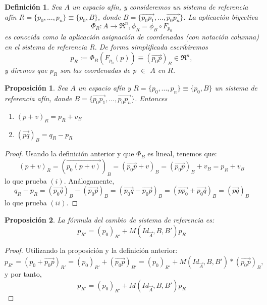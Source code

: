 \documentclass[a4paper,11pt, oneside]{book}
\newtheorem{defi}{Definición}
\newtheorem{prop}{Proposición}
\begin{document}
\begin{defi}
	Sea $A$ un espacio afín, y consideremos un sistema de referencia afín $R = \{p_0,...,p_n\} \equiv \{p_0, B\}$, donde
	$B = \{\overrightarrow{p_0p_1},...,\overrightarrow{p_0p_n}\}$. La aplicación biyectiva
	\begin{equation}
	\Phi_R : A \rightarrow \Re^n, \phi_R = \phi_B \circ F_{p_0}
	\end{equation}
	es conocida como la aplicación asignación de coordenadas (con notación columna) en el sistema de referencia R. De forma simplificada escribiremos
	\begin{equation}
	p_R := \Phi_B(F_{p_0}(p)) \equiv (\overrightarrow{p_0p})_B \in \Re^n, 
	\end{equation}
	y diremos que $p_R$ son las coordenadas de p $\in$ $A$ en $R$.
\end{defi}
\begin{prop}
	Sea $A$ un espacio afín y $R = \{p_0,...,p_n\} \equiv \{p_0,B\}$ un sistema de referencia afín, donde $B = \{\overrightarrow{p_0p_1},...,\overrightarrow{p_0p_n}\}$. Entonces
	\begin{enumerate}
		\item $(p+v)_R = p_R + v_B$
		\item $(\overrightarrow{pq})_B = q_R - p_R$
	\end{enumerate}
\end{prop}
\begin{proof}
	Usando la definición anterior y que $\Phi_B$ es lineal, tenemos que:
	\begin{equation}
	(p+v)_R = (\overrightarrow{p_0(p+v)})_B = (\overrightarrow{p_0p}+v)_B = (\overrightarrow{p_0p})_B +v_B = p_R +v_B
	\end{equation}
	lo que prueba $(i)$. Análogamente,
	\begin{equation}
	q_R - p_R = (\overrightarrow{p_0q})_B - (\overrightarrow{p_0p})_B = (\overrightarrow{p_0q} - \overrightarrow{p_0p})_B = (\overrightarrow{pp_0}+\overrightarrow{p_0q})_B = (\overrightarrow{pq})_B
	\end{equation}
	lo que prueba $(ii)$.
\end{proof}
\begin{prop}
		La fórmula del cambio de sistema de referencia es:
	\begin{equation}
		p_{R'} = (p_0)_{R'} + M(Id_{\overrightarrow{A}}, B, B')p_R
	\end{equation}
\end{prop}
\begin{proof}
	Utilizando la proposición y la definición anterior:
	\begin{equation}
	p_{R'} = (p_0 + \overrightarrow{p_0p})_{R'} = (p_0)_{R'} + (\overrightarrow{p_{0}p})_{B'} = (p_0)_{R'} + M(Id_{\overrightarrow{A}}, B, B') * (\overrightarrow{p_0p})_B,
	\end{equation}
	y por tanto,
	\begin{equation}
	p_{R'} = (p_0)_{R'} + M(Id_{\overrightarrow{A}}, B, B')p_R
	\end{equation}
\end{proof}
\end{document}
